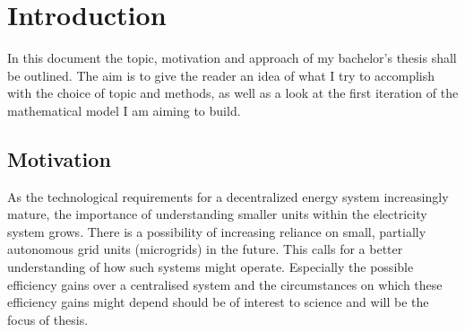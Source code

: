 \documentclass[
	11pt,								%
	DIV10,								%
	a4paper,         					%
	oneside,							%
	headheight=20pt,					%
	footheight=20pt,					%
    parskip=full,						%
    listof=totoc,						%
	bibliography=totoc,					%
	index=totoc,						%
]{scrartcl}
\begin{document}



\section{Introduction}
In this document the topic, motivation and approach of my bachelor’s thesis shall be outlined. The aim is to give the reader an idea of what I try to accomplish with the choice of topic and methods, as well as a look at the first iteration of the mathematical model I am aiming to build.

\subsection{Motivation}
As the technological requirements for a decentralized energy system increasingly mature, the importance of understanding smaller units within the electricity system grows. There is a possibility of increasing reliance on small, partially autonomous grid units (microgrids) in the future. This calls for a better understanding of how such systems might operate. Especially the possible efficiency gains over a centralised system and the circumstances on which these efficiency gains might depend should be of interest to science and will be the focus of thesis.
\end{document}
